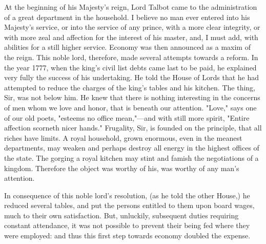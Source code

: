 At the beginning of his Majesty's reign, Lord Talbot came to the administration of a great department in the household. I believe no man ever entered into his Majesty's service, or into the service of any prince, with a more clear integrity, or with more zeal and affection for the interest of his master, and, I must add, with abilities for a still higher service. Economy was then announced as a maxim of the reign. This noble lord, therefore, made several attempts towards a reform. In the year 1777, when the king's civil list debts came last to be paid, he explained very fully the success of his undertaking. He told the House of Lords that he had attempted to reduce the charges of the king's tables and his kitchen. The thing, Sir, was not below him. He knew that there is nothing interesting in the concerns of men whom we love and honor, that is beneath our attention. "Love," says one of our old poets, "esteems no office mean,"—and with still more spirit, "Entire affection scorneth nicer hands." Frugality, Sir, is founded on the principle, that all riches have limits. A royal household, grown enormous, even in the meanest departments, may weaken and perhaps destroy all energy in the highest offices of the state. The gorging a royal kitchen may stint and famish the negotiations of a kingdom. Therefore the object was worthy of his, was worthy of any man's attention.

In consequence of this noble lord's resolution, (as he told the other House,) he reduced several tables, and put the persons entitled to them upon board wages, much to their own satisfaction. But, unluckily, subsequent duties requiring constant attendance, it was not possible to prevent their being fed where they were employed: and thus this first step towards economy doubled the expense.

